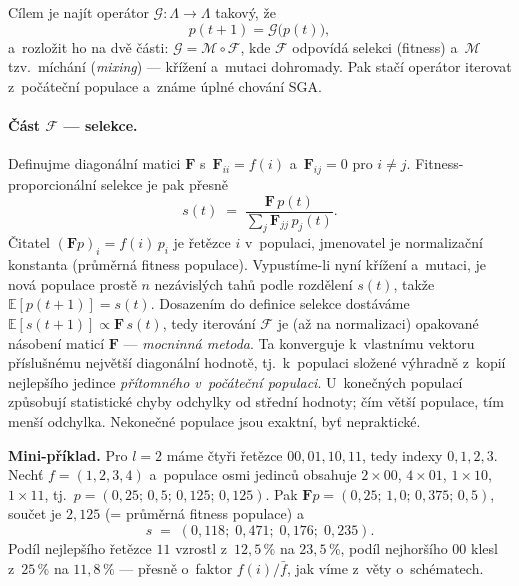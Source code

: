\documentclass[11pt,a4paper]{article}
\theoremstyle{definition}
\begin{document}
Cílem je najít operátor $\mathcal{G}: \Lambda \to \Lambda$ takový, že
\[
p(t+1) = \mathcal{G}\big(p(t)\big),
\]
a~rozložit ho na dvě části: $\mathcal{G} = \mathcal{M} \circ \mathcal{F}$,
kde $\mathcal{F}$ odpovídá selekci (fitness) a~$\mathcal{M}$ tzv.\ míchání
(\emph{mixing}) --- křížení a~mutaci dohromady. Pak stačí operátor iterovat
z~počáteční populace a~známe úplné chování SGA.

\paragraph{Část $\mathcal{F}$ --- selekce.} Definujme diagonální matici
$\mathbf{F}$ s~$\mathbf{F}_{ii} = f(i)$ a~$\mathbf{F}_{ij} = 0$ pro $i \ne j$.
Fitness-proporcionální selekce je pak přesně
\[
s(t) \;=\; \frac{\mathbf{F}\,p(t)}{\sum_j \mathbf{F}_{jj}\,p_j(t)} .
\]
Čitatel $(\mathbf{F}p)_i = f(i)\,p_i$ je  řetězce $i$ v~populaci,
jmenovatel je normalizační konstanta (průměrná fitness populace).
Vypustíme-li nyní křížení a~mutaci, je nová populace prostě $n$ nezávislých
tahů podle rozdělení $s(t)$, takže $\mathbb{E}[p(t+1)] = s(t)$. Dosazením
do definice selekce dostáváme $\mathbb{E}[s(t+1)] \propto \mathbf{F}\,s(t)$,
tedy iterování $\mathcal{F}$ je (až na normalizaci) opakované násobení
maticí $\mathbf{F}$ --- \emph{mocninná metoda}. Ta konverguje k~vlastnímu
vektoru příslušnému největší diagonální hodnotě, tj.\ k~populaci složené
výhradně z~kopií nejlepšího jedince \emph{přítomného v~počáteční populaci}.
U~konečných populací způsobují statistické chyby odchylky od střední hodnoty;
čím větší populace, tím menší odchylka. Nekonečné populace jsou exaktní, byť
nepraktické.

\textbf{Mini-příklad.} Pro $l = 2$ máme čtyři řetězce $00,01,10,11$, tedy
indexy $0,1,2,3$. Nechť $f = (1, 2, 3, 4)$ a~populace osmi jedinců obsahuje
$2\times 00$, $4\times 01$, $1\times 10$, $1\times 11$, tj.\
$p = (0{,}25;\,0{,}5;\,0{,}125;\,0{,}125)$. Pak
$\mathbf{F}p = (0{,}25;\,1{,}0;\,0{,}375;\,0{,}5)$, součet je $2{,}125$
(= průměrná fitness populace) a
\[
s \;=\; (0{,}118;\; 0{,}471;\; 0{,}176;\; 0{,}235).
\]
Podíl nejlepšího řetězce $11$ vzrostl z~$12{,}5\,\%$ na $23{,}5\,\%$, podíl
nejhoršího $00$ klesl z~$25\,\%$ na $11{,}8\,\%$ --- přesně o~faktor
$f(i)/\bar f$, jak víme z~věty o~schématech.
\end{document}
